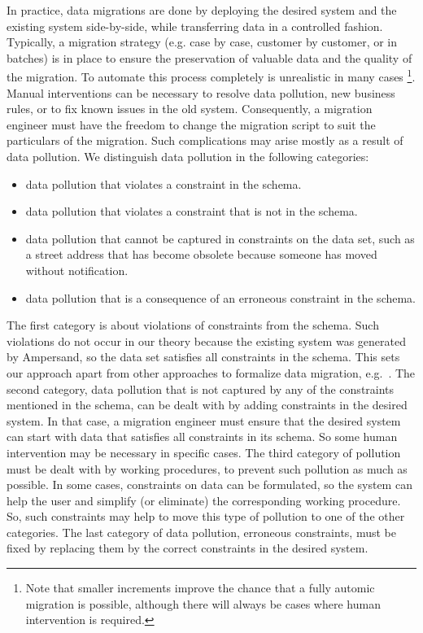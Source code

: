 \documentclass{elsarticle}
\begin{document}
   In practice, data migrations are done by deploying the desired system and the existing system side-by-side,
   while transferring data in a controlled fashion.
   Typically, a migration strategy (e.g. case by case, customer by customer, or in batches) is in place
   to ensure the preservation of valuable data and the quality of the migration.
   To automate this process completely is unrealistic in many cases%
\footnote{Note that smaller increments improve the chance that a fully automic migration is possible,
although there will always be cases where human intervention is required.}.
   Manual interventions can be necessary to resolve data pollution, new business rules, or to fix known issues in the old system.
   Consequently, a migration engineer must have the freedom to change the migration script to suit the particulars of the migration.
   Such complications may arise mostly as a result of data pollution.
   We distinguish data pollution in the following categories:
\begin{itemize}
   \item data pollution that violates a constraint in the schema.
   \item data pollution that violates a constraint that is not in the schema.
   \item data pollution that cannot be captured in constraints on the data set,
   such as a street address that has become obsolete because someone has moved without notification.
   \item data pollution that is a consequence of an erroneous constraint in the schema.
\end{itemize}
   The first category is about violations of constraints from the schema.
   Such violations do not occur in our theory because the existing system was generated by Ampersand,
   so the data set satisfies all constraints in the schema.
   This sets our approach apart from other approaches to formalize data migration, e.g.~\cite{Thalheim2013}.
   The second category, data pollution that is not captured by any of the constraints mentioned in the schema,
   can be dealt with by adding constraints in the desired system.
   In that case, a migration engineer must ensure that the desired system can start with data that satisfies all constraints in its schema.
   So some human intervention may be necessary in specific cases.
   The third category of pollution must be dealt with by working procedures, to prevent such pollution as much as possible.
   In some cases, constraints on data can be formulated,
   so the system can help the user and simplify (or eliminate) the corresponding working procedure.
   So, such constraints may help to move this type of pollution to one of the other categories.
   The last category of data pollution, erroneous constraints, must be fixed by replacing them by the correct constraints in the desired system.
\end{document}
